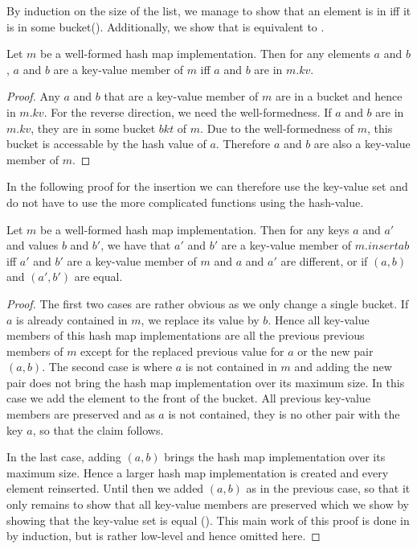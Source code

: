 By induction on the size of the list, we manage to show that an element is in \StdHashMapImpkv iff it is in some bucket(\StdArrayfoldlunion). Additionally, we  
show that \StdHashMapImpkv is equivalent to \StdHashMapImpkvmember.

\begin{lemma}[\StdHashMapImpkvmemberiffinkv]
  Let $m$ be a well-formed hash map implementation. Then for any elements $a$ and $b$, $a$ and $b$ are a key-value member of $m$ iff $a$ and $b$ are in $m.kv$.
\end{lemma}
\begin{proof}
  Any $a$ and $b$ that are a key-value member of $m$ are in a bucket and hence in $m.kv$. For the reverse direction, we need the well-formedness. If $a$ and $b$ are in $m.kv$, they are in some bucket $bkt$ of $m$. Due to the well-formedness of $m$, this bucket is accessable by the hash value of $a$. Therefore $a$ and $b$ are also a key-value member of $m$.
\end{proof}

In the following proof for the insertion we can therefore use the key-value set and do not have to use the more complicated functions using the hash-value.

\begin{lemma}[\StdHashMapImpinsertsemantics]
  Let $m$ be a well-formed hash map implementation. Then for any keys $a$ and $a'$ and values $b$ and $b'$, we have that $a'$ and $b'$ are a key-value member of $m.insert a b$ iff $a'$ and $b'$ are a key-value member of $m$ and $a$ and $a'$ are different, or if $(a,b)$ and $(a',b')$ are equal.
\end{lemma}
\begin{proof}
The first two cases are rather obvious as we only change a single bucket. If $a$ is already contained in $m$, we replace its value by $b$. Hence all key-value members of this hash map implementations are all the previous previous members of $m$ except for the replaced previous value for $a$ or the new pair $(a,b)$. The second case is where $a$ is not contained in $m$ and adding the new pair does not bring the hash map implementation over its maximum size. In this case we add the element to the front of the bucket. All previous key-value members are preserved and as $a$ is not contained, they is no other pair with the key $a$, so that the claim follows.

In the last case, adding $(a,b)$ brings the hash map implementation over its maximum size. Hence a larger hash map implementation is created and every element reinserted. Until then we added $(a,b)$ as in the previous case, so that it only remains to show that all key-value members are preserved which we show by showing that the key-value set is equal (\StdHashMapImpexpandpreservesmem). This main work of this proof is done in \StdHashMapImpexpandgomem by induction, but is rather low-level and hence omitted here.
\end{proof}

